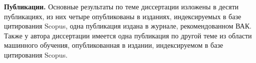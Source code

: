 \textbf{Публикации.}
Основные результаты по теме диссертации изложены в десяти публикациях, из них четыре опубликованы в изданиях, индексируемых в базе цитирования Scopus, одна публикация издана в журнале, рекомендованном ВАК.
Также у автора диссертации имеется одна публикация по другой теме из области машинного обучения, опубликованная в издании, индексируемом в базе цитирования Scopus.